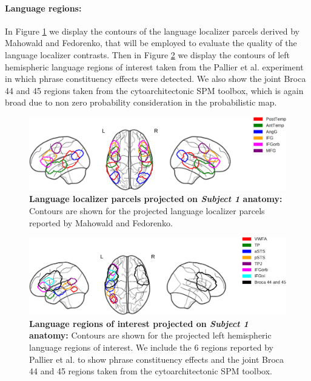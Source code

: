 \paragraph{Language regions:}
In Figure \ref{fig:fedorenko_example_img} we display the contours of the language localizer parcels derived by Mahowald and Fedorenko\citep{mahowald2016reliable}, that will be employed to evaluate the quality of the language localizer contrasts.
Then in Figure \ref{fig:langrois_example_img} we display the contours of left hemispheric language regions of interest taken from the Pallier et al. experiment in which phrase constituency effects were detected\citep{pallier2011cortical}.
We also show the joint Broca 44 and 45 regions taken from the cytoarchitectonic SPM toolbox\citep{eickhoff2005new}, which is again broad due to non zero probability consideration in the probabilistic map.


\begin{figure}[hptb]
\centering
\includegraphics[width=1.0 \linewidth]{figures/part_II/fedorenko_example_img_with_legend.pdf}
\caption{\textbf{Language localizer parcels projected on \emph{Subject 1} anatomy:}
Contours are shown for the projected language localizer parcels reported by Mahowald and Fedorenko.
}
\label{fig:fedorenko_example_img}
\end{figure}


\begin{figure}[hptb]
\centering
\includegraphics[width=1.0 \linewidth]{figures/part_II/language_example_img_with_legend.pdf}
\caption{\textbf{Language regions of interest projected on \emph{Subject 1} anatomy:}
Contours are shown for the projected left hemispheric language regions of interest. We include the 6 regions reported by Pallier et al. to show phrase constituency effects and the joint Broca 44 and 45 regions taken from the cytoarchitectonic SPM toolbox.
}
\label{fig:langrois_example_img}
\end{figure}


